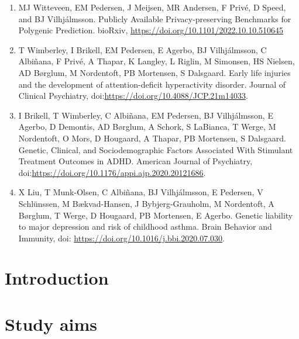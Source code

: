 \documentclass[a4paper, twoside]{report}
\begin{document}
\begin{enumerate}
	\item MJ Witteveen, EM Pedersen, J Meijsen, MR Andersen, F Privé, D Speed, and BJ Vilhjálmsson. Publicly Available Privacy-preserving Benchmarks for Polygenic Prediction. bioRxiv, \url{https://doi.org/10.1101/2022.10.10.510645}
	\item T Wimberley, I Brikell, EM Pedersen, E Agerbo, BJ Vilhjálmsson, C Albiñana, F Privé, A Thapar, K Langley, L Riglin, M Simonsen, HS Nielsen, AD Børglum, M Nordentoft, PB Mortensen, S Dalsgaard. Early life injuries and the development of attention-deficit hyperactivity disorder.  Journal of Clinical Psychiatry, doi:\url{https://doi.org/10.4088/JCP.21m14033}.
	\item I Brikell, T Wimberley, C Albiñana, EM Pedersen, BJ Vilhjálmsson, E Agerbo, D Demontis, AD Børglum, A Schork, S LaBianca, T Werge, M Nordentoft, O Mors, D Hougaard, A Thapar, PB Mortensen, S Dalsgaard. Genetic, Clinical, and Sociodemographic Factors Associated With Stimulant Treatment Outcomes in ADHD.  American Journal of Psychiatry, doi:\url{https://doi.org/10.1176/appi.ajp.2020.20121686}.
	\item X Liu, T Munk-Olsen, C Albiñana, BJ Vilhjálmsson, E Pedersen, V Schlünssen, M Bækvad-Hansen, J Bybjerg-Grauholm, M Nordentoft, A Børglum, T Werge, D Hougaard, PB Mortensen, E Agerbo. Genetic liability to major depression and risk of childhood asthma. Brain Behavior and Immunity, doi: \url{https://doi.org/10.1016/j.bbi.2020.07.030}.
	
\end{enumerate}



\tableofcontents
\newpage

\chapter{Introduction}


%

\chapter{Study aims}

\end{document}
